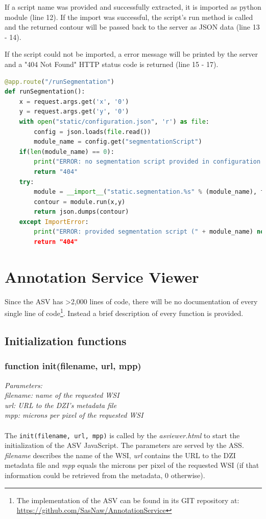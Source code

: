 If a script name was provided and successfully extracted, it is imported as python module (line 12). If the import was successful, the script's run method is called and the returned contour will be passed back to the server as JSON data (line 13 - 14).

If the script could not be imported, a error message will be printed by the server and a "404 Not Found" HTTP status code is returned (line 15 - 17).

\begin{lstlisting}[language=Python, frame=single]
@app.route("/runSegmentation")
def runSegmentation():
	x = request.args.get('x', '0')
	y = request.args.get('y', '0')
	with open("static/configuration.json", 'r') as file:
		config = json.loads(file.read())
		module_name = config.get("segmentationScript")
	if(len(module_name) == 0):
		print("ERROR: no segmentation script provided in configuration file (configuration.json)!")
		return "404"
	try:
		module = __import__("static.segmentation.%s" % (module_name), fromlist=["segmentation"])
		contour = module.run(x,y)
		return json.dumps(contour)
	except ImportError:
		print("ERROR: provided segmentation script (" + module_name) not found!")
		return "404"
\end{lstlisting}


\section{Annotation Service Viewer}
\label{sec_B2}
Since the ASV has \textgreater 2,000 lines of code, there will be no documentation of every single line of code\footnote{
	The implementation of the ASV can be found in its GIT repository at: \url{https://github.com/SasNaw/AnnotationService}
}. Instead a brief description of every function is provided.


\subsection{Initialization functions}

\subsubsection{function init(file{\textunderscore}name, url, mpp)}
\emph{Parameters:\\
	file{\textunderscore}name: name of the requested WSI\\
	url: URL to the DZI's metadata file\\
	mpp: microns per pixel of the requested WSI\\ \\
}
The \texttt{init(file{\textunderscore}name, url, mpp)} is called by the \emph{as{\textunderscore}viewer.html} to start the initialization of the ASV JavaScript. The parameters are served by the ASS. \emph{file{\textunderscore}name} describes the name of the WSI, \emph{url} contains the URL to the DZI metadata file and \emph{mpp} equals the microns per pixel of the requested WSI (if that information could be retrieved from the metadata, 0 otherwise).

